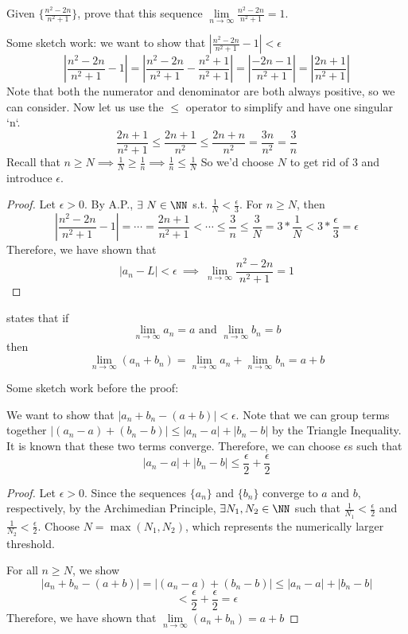\documentclass[12pt]{scrartcl}
\begin{document}
\begin{example}
  Given $\{\frac{n^2 - 2n}{n^2 + 1}\}$, prove that this sequence $\underset{n\to\infty}{\lim}\frac{n^2 - 2n}{n^2 + 1} = 1$.

  Some sketch work: we want to show that $|\frac{n^2 - 2n}{n^2 + 1} - 1| < \epsilon$
  \[|\frac{n^2 - 2n}{n^2 + 1} - 1| = |\frac{n^2 - 2n}{n^2 + 1} - \frac{n^2 + 1}{n^2 + 1}| = |\frac{-2n - 1}{n^2 + 1}| = |\frac{2n + 1}{n^2 + 1}|\]
  Note that both the numerator and denominator are both always positive, so we can consider. 
  Now let us use the $\leq$ operator to simplify and have one singular `n`.
  \[\frac{2n+1}{n^2+1} \leq \frac{2n + 1}{n^2} \leq \frac{2n+n}{n^2} = \frac{3n}{n^2} = \frac{3}{n}\]
  Recall that $n \geq N \implies \frac{1}{N} \geq \frac{1}{n} \implies \frac{1}{n} \leq \frac{1}{N}$
  So we'd choose $N$ to get rid of $3$ and introduce $\epsilon$. 
  \begin{proof}
    Let $\epsilon > 0$. By A.P., $\exists \ N \in \NN$ s.t. $\frac{1}{N} < \frac{\epsilon}{3}$. 
    For $n \geq N$, then
    \[|\frac{n^2-2n}{n^2 + 1} - 1| = \cdots = \frac{2n + 1}{n^2 + 1} < \cdots \leq \frac{3}{n} \leq \frac{3}{N} = 3 * \frac{1}{N} < 3 * \frac{\epsilon}{3} = \epsilon\]
    Therefore, we have shown that
    \[|a_n - L| < \epsilon \ \implies \ \lim_{n\to\infty}\frac{n^2-2n}{n^2 + 1} = 1\]
  \end{proof}
\end{example}

\begin{theorem}
   states that if
  \[\lim_{n\to\infty} a_n = a \text{ and } \lim_{n\to\infty}b_n = b\]
  then 
  \[\lim_{n\to\infty}(a_n + b_n) = \lim_{n\to\infty}a_n + \lim_{n\to\infty}b_n = a + b\]

  Some sketch work before the proof:

  We want to show that $|a_n + b_n - (a + b)| < \epsilon$. Note that we can group terms together
  $|(a_n - a) + (b_n - b)| \leq |a_n - a| + |b_n - b|$ by the Triangle Inequality. 
  It is known that these two terms converge. Therefore, we can choose $\epsilon$s such that 
  \[|a_n - a| + |b_n - b| \leq \frac{\epsilon}{2} + \frac{\epsilon}{2}\]

  \begin{proof}
    
    \hfill

    Let $\epsilon > 0$. Since the sequences $\{a_n\}$ and $\{b_n\}$ converge to $a$ and $b$, 
    respectively, by the Archimedian Principle, $\exists N_1, N_2 \in \NN$ such that 
    $\frac{1}{N_1} < \frac{\epsilon}{2}$ and $\frac{1}{N_2} < \frac{\epsilon}{2}$. 
    Choose $N = \max(N_1, N_2)$, which represents the numerically larger threshold.

    For all $n \geq N$, we show 
    \[|a_n + b_n - (a + b)| = |(a_n - a) + (b_n - b)| \leq |a_n - a| + |b_n - b|\]
    \[< \frac{\epsilon}{2} + \frac{\epsilon}{2} = \epsilon\]
    Therefore, we have shown that $\underset{n\to\infty}{\lim} (a_n + b_n) = a + b$
  \end{proof}

\end{theorem}
\end{document}
